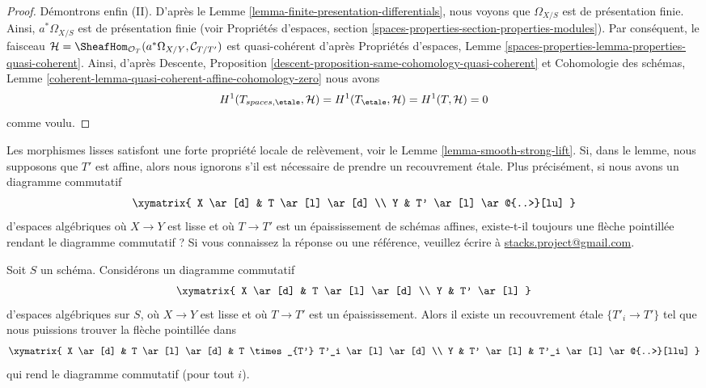 \begin{proof}
\medskip\noindent
Démontrons enfin (II). D'après le
Lemme \ref{lemma-finite-presentation-differentials},
nous voyons que $\Omega_{X/S}$ est de présentation finie.
Ainsi, $a^*\Omega_{X/S}$ est de présentation finie (voir
Propriétés d'espaces,
section \ref{spaces-properties-section-properties-modules}).
Par conséquent, le faisceau
$\mathcal{H} =
\SheafHom_{\mathcal{O}_T}(a^*\Omega_{X/Y}, \mathcal{C}_{T/T'})$
est quasi-cohérent d'après
Propriétés d'espaces,
Lemme \ref{spaces-properties-lemma-properties-quasi-coherent}.
Ainsi, d'après
Descente, Proposition \ref{descent-proposition-same-cohomology-quasi-coherent}
et Cohomologie des schémas, Lemme
\ref{coherent-lemma-quasi-coherent-affine-cohomology-zero}
nous avons
$$
H^1(T_{spaces, \etale}, \mathcal{H}) =
H^1(T_\etale, \mathcal{H}) =
H^1(T, \mathcal{H}) = 0
$$
comme voulu.
\end{proof}

\noindent
Les morphismes lisses satisfont une forte propriété locale de relèvement, voir le
Lemme \ref{lemma-smooth-strong-lift}. Si, dans le lemme, nous
supposons que $T'$ est affine, alors
nous ignorons s'il est nécessaire de prendre un recouvrement étale.
Plus précisément, si nous avons un diagramme commutatif
$$
\xymatrix{
X \ar[d] & T \ar[l] \ar[d] \\
Y & T' \ar[l] \ar@{..>}[lu]
}
$$
d'espaces algébriques où $X \to Y$ est lisse
et où $T \to T'$ est un épaississement de schémas affines,
existe-t-il toujours une flèche pointillée rendant le diagramme
commutatif ? Si vous connaissez la réponse ou une référence, veuillez écrire à
\href{mailto:stacks.project@gmail.com}{stacks.project@gmail.com}.

\begin{lemma}
\label{lemma-smooth-strong-lift}
Soit $S$ un schéma. Considérons un diagramme commutatif
$$
\xymatrix{
X \ar[d] & T \ar[l] \ar[d] \\
Y & T' \ar[l]
}
$$
d'espaces algébriques sur $S$, où $X \to Y$ est lisse
et où $T \to T'$ est un épaississement. Alors il existe un
recouvrement étale $\{T'_i \to T'\}$ tel que nous
puissions trouver la flèche pointillée dans
$$
\xymatrix{
X \ar[d] & T \ar[l] \ar[d] & T \times_{T'} T'_i \ar[l] \ar[d] \\
Y & T' \ar[l] & T'_i \ar[l] \ar@{..>}[llu]
}
$$
qui rend le diagramme commutatif (pour tout $i$).
\end{lemma}

